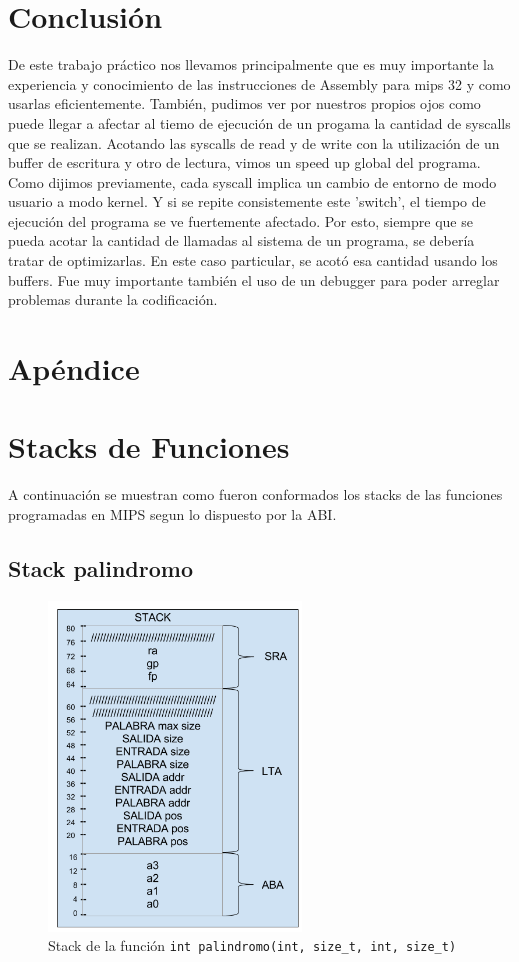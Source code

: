 \documentclass[11pt,a4paper]{article}
\begin{document}
\section{Conclusión}
De este trabajo práctico nos llevamos principalmente que es muy importante la experiencia y conocimiento de las instrucciones de Assembly para mips 32 y como usarlas eficientemente. También, pudimos ver por nuestros propios ojos como puede llegar a afectar al tiemo de ejecución de un progama la cantidad de syscalls que se realizan. Acotando las syscalls de read y de write con la utilización de un buffer de escritura y otro de lectura, vimos un speed up global del programa.
Como dijimos previamente, cada syscall implica un cambio de entorno de modo usuario a modo kernel. Y si se repite consistemente este 'switch', el tiempo de ejecución del programa se ve fuertemente afectado. Por esto, siempre que se pueda acotar la cantidad de llamadas al sistema de un programa, se debería tratar de optimizarlas. En este caso particular, se acotó esa cantidad usando los buffers. 
Fue muy importante también el uso de un debugger para poder arreglar problemas durante la codificación.

\appendix

\section*{Apéndice}

\section{Stacks de Funciones}
A continuación se muestran como fueron conformados los stacks de las funciones programadas en MIPS segun lo dispuesto por la ABI.

\subsection{Stack palindromo}
\begin{figure}[H]
	\centering	
	\includegraphics[width=0.6\textwidth]{stack_palindromo}
	\caption{Stack de la función \texttt{int palindromo(int, size\_t, int, size\_t)}}
\end{figure}
\end{document}

